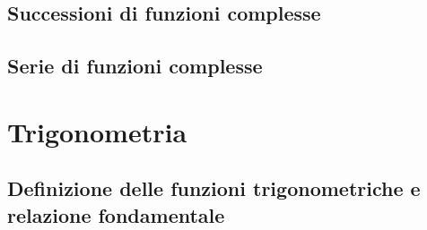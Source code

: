 \documentclass[letterpaper,10pt,italian]{jupyterBook}
\begin{document}
\section{Successioni di funzioni complesse}
\label{\detokenize{ch/series:successioni-di-funzioni-complesse}}\label{\detokenize{ch/series:math-hs-series-fun-complex-sequences}}

\section{Serie di funzioni complesse}
\label{\detokenize{ch/series:serie-di-funzioni-complesse}}\label{\detokenize{ch/series:math-hs-series-fun-complex-series}}
\sphinxstepscope


\chapter{Trigonometria}
\label{\detokenize{ch/trigonometry:trigonometria}}\label{\detokenize{ch/trigonometry:math-hs-trigonometry}}\label{\detokenize{ch/trigonometry::doc}}

\section{Definizione delle funzioni trigonometriche e relazione fondamentale}
\label{\detokenize{ch/trigonometry:definizione-delle-funzioni-trigonometriche-e-relazione-fondamentale}}
\end{document}
